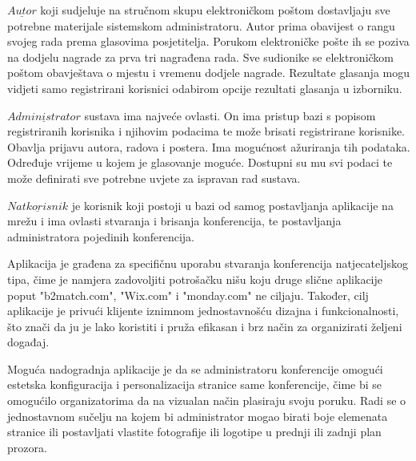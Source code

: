 		$\underline{Autor}$ koji sudjeluje na stručnom skupu elektroničkom poštom dostavljaju sve potrebne materijale sistemskom administratoru. Autor prima obavijest o rangu svojeg rada prema glasovima posjetitelja. Porukom elektroničke pošte ih se poziva na dodjelu nagrade za prva tri nagrađena rada. Sve sudionike se elektroničkom poštom obavještava o mjestu i vremenu dodjele nagrade. Rezultate glasanja mogu vidjeti samo registrirani korisnici odabirom opcije rezultati glasanja u izborniku.
		
		$\underline{Administrator}$ sustava ima najveće ovlasti. On ima pristup bazi s popisom registriranih korisnika i njihovim podacima te može brisati registrirane korisnike. Obavlja prijavu autora, radova i postera. Ima mogućnost ažuriranja tih podataka. Određuje vrijeme u kojem je glasovanje moguće. Dostupni su mu svi podaci te može definirati sve potrebne uvjete za ispravan rad sustava.
		
		$\underline{Natkorisnik}$ je korisnik koji postoji u bazi od samog postavljanja aplikacije na mrežu i ima ovlasti stvaranja i brisanja konferencija, te postavljanja administratora pojedinih konferencija.
		
		Aplikacija je građena za specifičnu uporabu stvaranja konferencija natjecateljskog tipa, čime je namjera zadovoljiti potrošačku nišu koju druge slične aplikacije poput "b2match.com", "Wix.com" i "monday.com" ne ciljaju. Također, cilj aplikacije je privući klijente iznimnom jednostavnošću dizajna i funkcionalnosti, što znači da ju je lako koristiti i pruža efikasan i brz način za organizirati željeni događaj.
		
		Moguća nadogradnja aplikacije je da se administratoru konferencije omogući estetska konfiguracija i personalizacija stranice same konferencije, čime bi se omogućilo organizatorima da na vizualan način plasiraju svoju poruku. Radi se o jednostavnom sučelju na kojem bi administrator mogao birati boje elemenata stranice ili postavljati vlastite fotografije ili logotipe u prednji ili zadnji plan prozora.

		\eject
		
